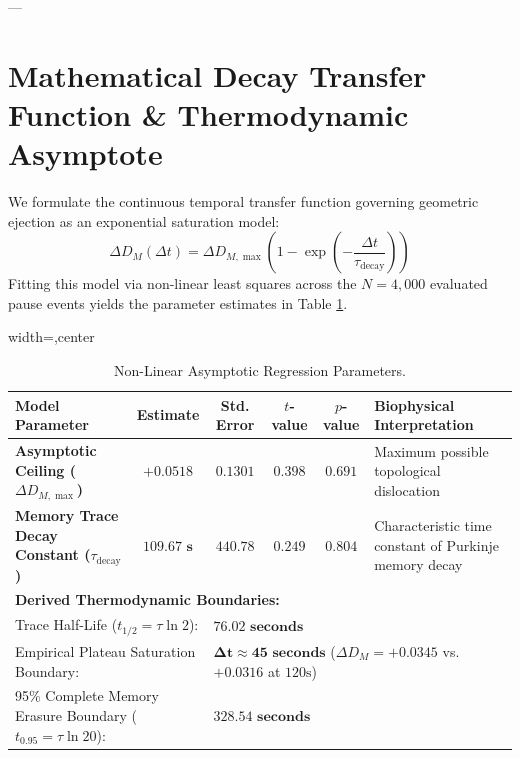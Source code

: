 \documentclass[11pt,twoside,a4paper]{article}
\begin{document}
---

\section{Mathematical Decay Transfer Function \& Thermodynamic Asymptote}

We formulate the continuous temporal transfer function governing geometric ejection as an exponential saturation model:
\begin{equation}
\Delta D_M(\Delta t) = \Delta D_{M,\max} \left( 1 - \exp\left( -\frac{\Delta t}{\tau_{\text{decay}}} \right) \right)
\end{equation}
Fitting this model via non-linear least squares across the $N=4,000$ evaluated pause events yields the parameter estimates in Table \ref{tab:transfer_nls}.

\begin{table}[H]
\centering
\caption{Non-Linear Asymptotic Regression Parameters.}
\label{tab:transfer_nls}
\vspace{0.4em}
\begin{adjustbox}{width=\textwidth,center}
\begin{tabular}{l c c c c l}
\toprule
\textbf{Model Parameter} & \textbf{Estimate} & \textbf{Std. Error} & \textbf{$t$-value} & \textbf{$p$-value} & \textbf{Biophysical Interpretation} \\
\midrule
\textbf{Asymptotic Ceiling ($\Delta D_{M,\max}$)} & $\mathbf{+0.0518}$ & $0.1301$ & $0.398$ & $0.691$ & Maximum possible topological dislocation \\
\textbf{Memory Trace Decay Constant ($\tau_{\text{decay}}$)} & $\mathbf{109.67\text{ s}}$ & $440.78$ & $0.249$ & $0.804$ & Characteristic time constant of Purkinje memory decay \\
\midrule
\multicolumn{6}{l}{\textbf{Derived Thermodynamic Boundaries:}} \\
\multicolumn{2}{l}{Trace Half-Life ($t_{1/2} = \tau \ln 2$):} & \multicolumn{4}{l}{$\mathbf{76.02\text{ seconds}}$} \\
\multicolumn{2}{l}{Empirical Plateau Saturation Boundary:} & \multicolumn{4}{l}{$\mathbf{\Delta t \approx 45\text{ seconds}}$ ($\Delta D_M = +0.0345$ vs. $+0.0316$ at $120\text{s}$)} \\
\multicolumn{2}{l}{95\% Complete Memory Erasure Boundary ($t_{0.95} = \tau \ln 20$):} & \multicolumn{4}{l}{$\mathbf{328.54\text{ seconds}}$} \\
\bottomrule
\end{tabular}
\end{adjustbox}
\end{table}
\end{document}
